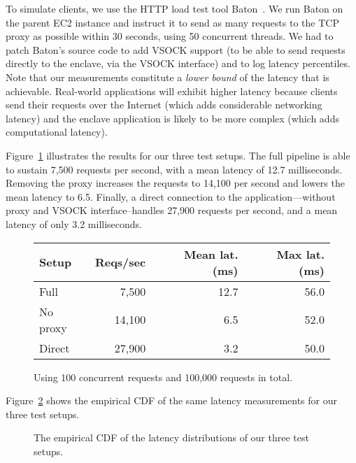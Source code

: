To simulate clients, we use the HTTP load test tool Baton~\cite{baton}.  We run
Baton on the parent EC2 instance and instruct it to send as many requests to the
TCP proxy as possible within 30 seconds, using 50 concurrent threads.  We had to
patch Baton's source code to add VSOCK support (to be able to send requests
directly to the enclave, via the VSOCK interface) and to log latency
percentiles.  Note that our measurements constitute a \emph{lower bound} of the
latency that is achievable.  Real-world applications will exhibit higher latency
because clients send their requests over the Internet (which adds considerable
networking latency) and the enclave application is likely to be more complex
(which adds computational latency).

Figure~\ref{fig:latency-msmts} illustrates the results for our three test
setups.  The full pipeline is able to sustain 7,500 requests per second, with a
mean latency of 12.7 milliseconds.  Removing the proxy increases the requests
to 14,100 per second and lowers the mean latency to 6.5.  Finally, a direct
connection to the application---without proxy and VSOCK interface--handles
27,900 requests per second, and a mean latency of only 3.2 milliseconds.

\begin{figure}[t]
    \centering
    \begin{tabular}{l r r r}
    \toprule
      Setup & Reqs/sec & Mean lat. (ms) & Max lat. (ms) \\
    \midrule
    Full & 7,500 & 12.7 & 56.0 \\
    No proxy & 14,100 & 6.5 & 52.0 \\
    Direct & 27,900 & 3.2 & 50.0 \\
    \bottomrule
    \end{tabular}
    \caption{Using 100 concurrent requests and 100,000 requests in total.}
    \label{fig:latency-msmts}
\end{figure}

Figure~\ref{fig:latency-cdf} shows the empirical CDF of the same latency
measurements for our three test setups.

\begin{figure}[t]
    \centering
    
    \label{fig:latency-cdf}
    \caption{The empirical CDF of the latency distributions of our three test setups.}
\end{figure}

